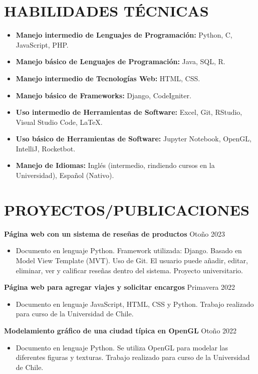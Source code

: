 \documentclass[a4paper, 10pt]{extarticle}
\begin{document}
\section*{HABILIDADES TÉCNICAS}
\begin{itemize}
    \item \textbf{Manejo intermedio de Lenguajes de Programación:} Python, C, JavaScript, PHP.
    \item \textbf{Manejo básico de Lenguajes de Programación:} Java, SQL, R.
    \item \textbf{Manejo intermedio de Tecnologías Web:} HTML, CSS.
    \item \textbf{Manejo básico de Frameworks:} Django, CodeIgniter.
    \item \textbf{Uso intermedio de Herramientas de Software:} Excel, Git, RStudio, Visual Studio Code, LaTeX.
    \item \textbf{Uso básico de Herramientas de Software:}  Jupyter Notebook, OpenGL, IntelliJ, Rocketbot.
    \item \textbf{Manejo de Idiomas:}  Inglés (intermedio, rindiendo cursos en la Universidad), Español (Nativo).
\end{itemize}

\section*{PROYECTOS/PUBLICACIONES}
\noindent
\textbf{Página web con un sistema de reseñas de productos} \textcolor{blue}{\href{https://github.com/Estefania-M/Pagina-Web-Resenas}{\faLink}} \hfill Otoño 2023
\begin{itemize}
    \item Documento en lenguaje Python. Framework utilizada: Django. Basado en Model View Template (MVT). Uso de Git. El usuario puede añadir, editar, eliminar, ver y calificar reseñas dentro del sistema. Proyecto universitario.
\end{itemize}
\vspace{12pt}
\noindent
\textbf{Página web para agregar viajes y solicitar encargos} \textcolor{blue}{\href{https://github.com/Estefania-M/Pagina-Web-Encargos-Viajes}{\faLink}} \hfill Primavera 2022
\begin{itemize}
    \item Documento en lenguaje JavaScript, HTML, CSS y Python. Trabajo realizado para curso de la Universidad de Chile.
\end{itemize}

\noindent
\textbf{Modelamiento gráfico de una ciudad típica en OpenGL} \textcolor{blue}{\href{https://github.com/Estefania-M/Modelamiento-Ciudad}{\faLink}} \hfill Otoño 2022
\begin{itemize}
    \item Documento en lenguaje Python. Se utiliza OpenGL para modelar las diferentes figuras y texturas. Trabajo realizado para curso de la Universidad de Chile.
\end{itemize}
\end{document}
